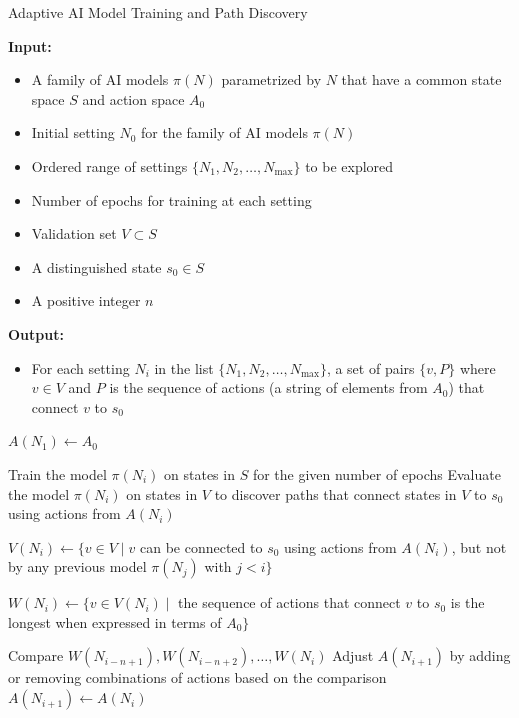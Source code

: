 \begin{algorithm}
    \caption{Adaptive AI Model Training and Path Discovery}
    \label{alg:adaptive_ai_model}
    \begin{algorithmic}[1]
        \State \textbf{Input:}
        \begin{itemize}
            \item[] A family of AI models $\pi(N)$ parametrized by $N$ that have a common state space $S$ and action space $A_0$
            \item[] Initial setting $N_0$ for the family of AI models $\pi(N)$
            \item[] Ordered range of settings $\{N_1, N_2, \ldots, N_{\text{max}}\}$ to be explored
            \item[] Number of epochs for training at each setting
            \item[] Validation set $V \subset S$
            \item[] A distinguished state $s_0 \in S$
            \item[] A positive integer $n$
        \end{itemize}
        
        \State \textbf{Output:}
        \begin{itemize}
            \item[] For each setting $N_i$ in the list $\{N_1, N_2, \ldots, N_{\text{max}}\}$, a set of pairs $\{v, P\}$ where $v \in V$ and $P$ is the sequence of actions (a string of elements from $A_0$) that connect $v$ to $s_0$
        \end{itemize}
        
        \State $A(N_1) \gets A_0$ 
        
            \State Train the model $\pi(N_i)$ on states in $S$ for the given number of epochs
            \State Evaluate the model $\pi(N_i)$ on states in $V$ to discover paths that connect states in $V$ to $s_0$ using actions from $A(N_i)$
            
            \State $V(N_i) \gets \{ v \in V \mid v$ can be connected to $s_0$ using actions from $A(N_i)$, but not by any previous model $\pi(N_j)$ with $j < i\}$ 
            
            \State $W(N_i) \gets \{ v \in V(N_i) \mid$ the sequence of actions that connect $v$ to $s_0$ is the longest when expressed in terms of $A_0 \}$ 
            
             
                \State Compare $W(N_{i-n+1}), W(N_{i-n+2}), \ldots, W(N_i)$
                \State Adjust $A(N_{i+1})$ by adding or removing combinations of actions based on the comparison
            \Else
                \State $A(N_{i+1}) \gets A(N_i)$ 
            \EndIf
        \EndFor
    \end{algorithmic}
\end{algorithm}


